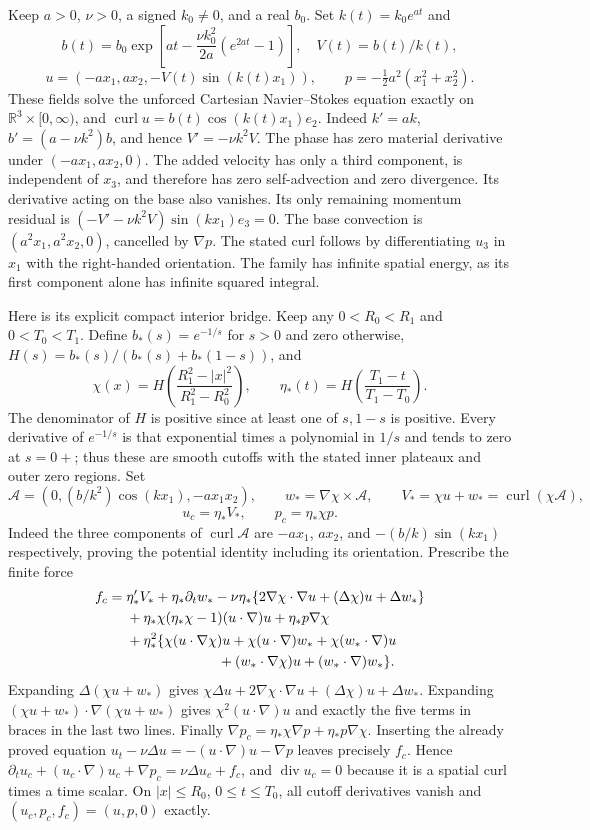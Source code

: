 Keep $a>0$, $\nu>0$, a signed $k_0\ne0$, and a real $b_0$.
Set $k(t)=k_0e^{at}$ and
\[
 b(t)=b_0\exp\left[at-\frac{\nu k_0^2}{2a}(e^{2at}-1)\right],
 \quad V(t)=b(t)/k(t),
\]
\[
 u=(-ax_1,ax_2,-V(t)\sin(k(t)x_1)),\qquad
 p=-\tfrac12a^2(x_1^2+x_2^2).
\]
These fields solve the unforced Cartesian Navier--Stokes equation
exactly on $\mathbb R^3\times[0,\infty)$, and
$\operatorname{curl}u=b(t)\cos(k(t)x_1)e_2$.
Indeed $k'=ak$, $b'=(a-\nu k^2)b$, and hence $V'=-\nu k^2V$.
The phase has zero material derivative under $(-ax_1,ax_2,0)$.
The added velocity has only a third component, is independent of
$x_3$, and therefore has zero self-advection and zero divergence.
Its derivative acting on the base also vanishes. Its only remaining
momentum residual is $(-V'-\nu k^2V)\sin(kx_1)e_3=0$.
The base convection is $(a^2x_1,a^2x_2,0)$, cancelled by $\nabla p$.
The stated curl follows by differentiating $u_3$ in $x_1$ with the
right-handed orientation. The family has infinite spatial energy,
as its first component alone has infinite squared integral.

Here is its explicit compact interior bridge. Keep any
$0<R_0<R_1$ and $0<T_0<T_1$. Define $b_*(s)=e^{-1/s}$ for $s>0$
and zero otherwise, $H(s)=b_*(s)/(b_*(s)+b_*(1-s))$, and
\[
 \chi(x)=H\left(\frac{R_1^2-|x|^2}{R_1^2-R_0^2}\right),\qquad
 \eta_*(t)=H\left(\frac{T_1-t}{T_1-T_0}\right).
\]
The denominator of $H$ is positive since at least one of $s,1-s$
is positive. Every derivative of $e^{-1/s}$ is that exponential times
a polynomial in $1/s$ and tends to zero at $s=0+$; thus these are
smooth cutoffs with the stated inner plateaux and outer zero regions.
Set
\[
 \mathcal A=(0,(b/k^2)\cos(kx_1),-ax_1x_2),\qquad
 w_* =\nabla\chi\times\mathcal A,\qquad
 V_* =\chi u+w_* =\operatorname{curl}(\chi\mathcal A),
\]
\[
 u_c=\eta_*V_*,\qquad p_c=\eta_*\chi p.
\]
Indeed the three components of $\operatorname{curl}\mathcal A$ are
$-ax_1$, $ax_2$, and $-(b/k)\sin(kx_1)$ respectively, proving the
potential identity including its orientation. Prescribe the finite force
\begin{align*}
 f_c={}&\eta_*'V_*+\eta_*\partial_tw_*
 -\nu\eta_*\{2\nabla\chi\cdot\nabla u+(\Delta\chi)u+\Delta w_*\}\\
 &+\eta_*\chi(\eta_*\chi-1)(u\cdot\nabla)u+\eta_*p\nabla\chi\\
 &+\eta_*^2\{\chi(u\cdot\nabla\chi)u
 +\chi(u\cdot\nabla)w_*+\chi(w_*\cdot\nabla)u\\
 &\hspace{23mm}+(w_*\cdot\nabla\chi)u+(w_*\cdot\nabla)w_*\}.
\end{align*}
Expanding $\Delta(\chi u+w_*)$ gives
$\chi\Delta u+2\nabla\chi\cdot\nabla u+(\Delta\chi)u+\Delta w_*$.
Expanding $(\chi u+w_*)\cdot\nabla(\chi u+w_*)$ gives
$\chi^2(u\cdot\nabla)u$ and exactly the five terms in braces in
the last two lines. Finally
$\nabla p_c=\eta_*\chi\nabla p+\eta_*p\nabla\chi$.
Inserting the already proved equation
$u_t-\nu\Delta u=-(u\cdot\nabla)u-\nabla p$
leaves precisely $f_c$. Hence
$\partial_tu_c+(u_c\cdot\nabla)u_c+\nabla p_c=\nu\Delta u_c+f_c$,
and $\operatorname{div}u_c=0$ because it is a spatial curl times a
time scalar. On $|x|\leq R_0$, $0\leq t\leq T_0$, all cutoff
derivatives vanish and $(u_c,p_c,f_c)=(u,p,0)$ exactly.

